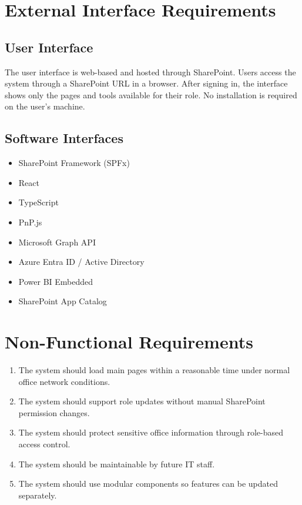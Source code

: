 \documentclass[12pt]{article}
\begin{document}
\section{External Interface Requirements}

\subsection{User Interface}
The user interface is web-based and hosted through SharePoint. Users access the system through a SharePoint URL in a browser. After signing in, the interface shows only the pages and tools available for their role. No installation is required on the user's machine.

\subsection{Software Interfaces}
\begin{itemize}
  \item SharePoint Framework (SPFx)
  \item React
  \item TypeScript
  \item PnP.js
  \item Microsoft Graph API
  \item Azure Entra ID / Active Directory
  \item Power BI Embedded
  \item SharePoint App Catalog
\end{itemize}

\section{Non-Functional Requirements}
\begin{enumerate}[label=NFR-\arabic*]
  \item The system should load main pages within a reasonable time under normal office network conditions.
  \item The system should support role updates without manual SharePoint permission changes.
  \item The system should protect sensitive office information through role-based access control.
  \item The system should be maintainable by future IT staff.
  \item The system should use modular components so features can be updated separately.
\end{enumerate}
\end{document}
